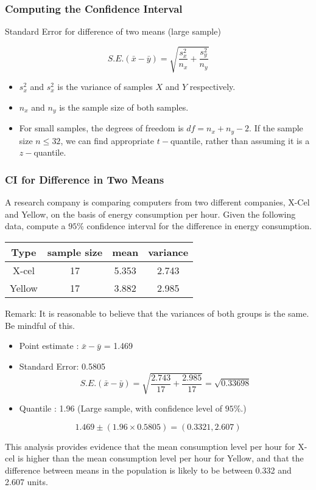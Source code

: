\documentclass[a4]{beamer}
\begin{document}
\begin{frame}
\frametitle{Computing the Confidence Interval}
Standard Error for difference of two means (large sample)

\[ S.E.(\bar{x}-\bar{y}) = \sqrt{\frac{s^2_x}{n_x} + \frac{s^2_y}{n_y}} \]

\begin{itemize}
\item $s^2_x$ and $s^2_x$ is the variance of samples $X$ and $Y$ respectively.
\item $n_x$ and $n_y$ is the sample size of both samples.\bigskip

\item For small samples, the degrees of freedom is $df = n_x + n_y - 2$. If the sample size $n \leq 32$, we can find appropriate $t-$quantile, rather than assuming it is a $z-$quantile.
\end{itemize}
\end{frame}

\begin{frame}
\frametitle{CI for Difference in Two Means}
A research company is comparing computers from two different companies, X-Cel and Yellow, on the basis of energy consumption per hour. Given the following data, compute a $95\%$ confidence interval for the difference in energy consumption.
\begin{center}
\begin{tabular}{|c|c|c|c|}
\hline
Type & sample size & mean & variance \\ \hline
X-cel & 17 & 5.353 & 2.743 \\ \hline
Yellow & 17 & 3.882 & 2.985 \\ \hline
\end{tabular}
\end{center}
Remark: It is reasonable to believe that the variances of both groups is the same. Be mindful of this.

\end{frame}
\begin{frame}
\begin{itemize}
\item Point estimate : $\bar{x} - \bar{y}$ = 1.469
\item Standard Error: 0.5805
\[ S.E.(\bar{x}-\bar{y}) = \sqrt{\frac{2.743}{17} + \frac{2.985}{17}} = \sqrt{0.33698} \]
\item Quantile : 1.96 (Large sample, with confidence level of $95\%$.)
\end{itemize}

\[ 1.469  \pm (1.96 \times 0.5805) = (0.3321,2.607) \]


This analysis provides evidence that the mean consumption level per hour for X-cel is higher than the mean consumption level per hour for Yellow, and that the difference between means in the population is likely to be between 0.332 and 2.607 units.
\end{frame}
\end{document}
